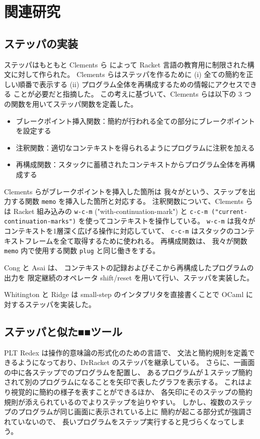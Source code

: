 \chapter{関連研究}
\label{chapter:related}

\section{ステッパの実装}
\label{section:stepper__related}

ステッパはもともと Clements ら \cite{clements01} によって
Racket 言語の教育用に制限された構文に対して作られた。
Clements らはステッパを作るために
(i) 全ての簡約を正しい順番で表示する
(ii) プログラム全体を再構成するための情報にアクセスできる
ことが必要だと指摘した。
この考えに基づいて、Clements らは以下の 3 つの関数を用いてステッパ関数を定義した。
\begin{itemize}
\item ブレークポイント挿入関数：簡約が行われる全ての部分にブレークポイントを設定する
\item 注釈関数：適切なコンテキストを得られるようにプログラムに注釈を加える
\item 再構成関数：スタックに蓄積されたコンテキストからプログラム全体を再構成する
\end{itemize}
Clements らがブレークポイントを挿入した箇所は
我々がという、ステップを出力する関数 \texttt{memo} を挿入した箇所と対応する。
注釈関数について、Clements らは Racket 組み込みの
\texttt{w-c-m} ("with-continuation-mark") と
\texttt{c-c-m ("current-continuation-marks")}
を使ってコンテキストを操作している。
\texttt{w-c-m} は我々がコンテキストを1層深く広げる操作に対応していて、
\texttt{c-c-m} はスタックのコンテキストフレームを全て取得するために使われる。
再構成関数は、
我々が関数 \texttt{memo} 内で使用する関数 \texttt{plug} と同じ働きをする。

Cong と Asai \cite{Cong16} は、
コンテキストの記録およびそこから再構成したプログラムの出力を
限定継続のオペレータ shift/reset を用いて行い、ステッパを実装した。

Whitington と Ridge \cite{EPTCS294.3} は
small-step のインタプリタを直接書くことで
OCaml に対するステッパを実装した。

\section{ステッパと似た■■ツール}

PLT Redex \cite{felleisen09}は操作的意味論の形式化のための言語で、
文法と簡約規則を定義できるようになっており、DrRacket のステッパを継承している。
さらに、一画面の中に各ステップでのプログラムを配置し、
あるプログラムが１ステップ簡約されて別のプログラムになることを矢印で表したグラフを表示する。
これはより視覚的に簡約の様子を表すことができるほか、
各矢印にそのステップの簡約規則が添えられているのでよりステップを辿りやすい。
しかし、複数のステップのプログラムが同じ画面に表示されている上に
簡約が起こる部分式が強調されていないので、
長いプログラムをステップ実行すると見づらくなってしまう。


